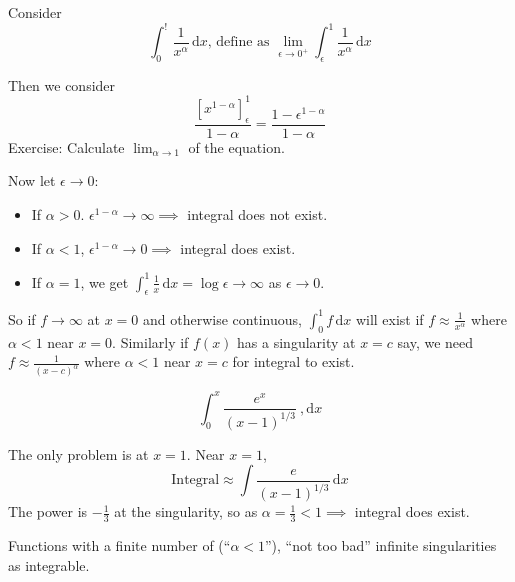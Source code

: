 \documentclass[10pt]{scrartcl}
\begin{document}
Consider 
\[\int_0^! \frac{1}{x^{\alpha}}\,\mathrm{d}x \text{, define as }\lim_{\epsilon \to 0^+}\int_{\epsilon}^1 \frac{1}{x^{\alpha}}\,\mathrm{d}x\]

Then we consider
\[\frac{[x^{1-\alpha}]_{\epsilon}^1}{1-\alpha} = \frac{1-\epsilon^{1-\alpha}}{1-\alpha}\]
Exercise: Calculate $\lim_{\alpha \to 1}$ of the equation. 

Now let $\epsilon \to 0$:
\begin{itemize}
  \item If $\alpha > 0$. $\epsilon^{1-\alpha} \to \infty \implies$ integral does not exist. 
  \item If $\alpha < 1$, $\epsilon^{1-\alpha} \to 0\implies$ integral does exist. 
  \item If $\alpha = 1$, we get $\int_{\epsilon}^1 \frac{1}{x}\,\mathrm{d}x = \log \epsilon \to \infty$ as $\epsilon \to 0$. 
\end{itemize}\vspace*{5pt}

So if $f \to \infty$ at $x = 0$ and otherwise continuous, $\int_0^1 f\,\mathrm{d}x$ will exist if $f \approx \frac{1}{x^\alpha}$ where $\alpha < 1$ near $x = 0$. Similarly if $f(x)$ has a singularity at $x =c$ say, we need $f \approx \frac{1}{(x-c)^{\alpha}}$ where $\alpha < 1$ near $x=c$ for integral to exist.\\

\begin{example}
\[\int_0^x \frac{e^x}{(x-1)^{1/3}}\
,\mathrm{d}x\]	

The only problem is at $x=1$. Near $x=1$, 
\[\text{Integral} \approx \int\frac{e}{(x-1)^{1/3}}\,\mathrm{d}x\]
The power is $-\frac{1}{3}$ at the singularity, so as $\alpha = \frac{1}{3} < 1 \implies$ integral does exist.
\end{example}

Functions with a finite number of (``$\alpha < 1$''), ``not too bad'' infinite singularities as integrable.\\
\end{document}

